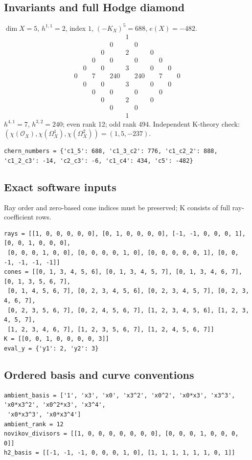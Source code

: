 \documentclass[10pt,a4paper]{article}
\begin{document}
\subsection*{Invariants and full Hodge diamond}
$\dim X=5$, $h^{1,1}=2$, index $1$, $(-K_X)^5=688$, $e(X)=-482$.
\[\begin{array}{ccccccccccc}&&&&&1&&&&&\\&&&&0&&0&&&&\\&&&0&&2&&0&&&\\&&0&&0&&0&&0&&\\&0&&0&&3&&0&&0&\\0&&7&&240&&240&&7&&0\\&0&&0&&3&&0&&0&\\&&0&&0&&0&&0&&\\&&&0&&2&&0&&&\\&&&&0&&0&&&&\\&&&&&1&&&&&\end{array}\]
$h^{4,1}=7$, $h^{3,2}=240$; even rank 12; odd rank 494.
Independent K-theory check: $(\chi(\mathcal O_X),\chi(\Omega_X^1),\chi(\Omega_X^2))=(1, 5, -237)$.
\begin{lstlisting}
chern_numbers = {'c1_5': 688, 'c1_3_c2': 776, 'c1_c2_2': 888, 'c1_2_c3': -14, 'c2_c3': -6, 'c1_c4': 434, 'c5': -482}
\end{lstlisting}
\subsection*{Exact software inputs}
Ray order and zero-based cone indices must be preserved; K consists of full ray-coefficient rows.
\begin{lstlisting}
rays = [[1, 0, 0, 0, 0, 0], [0, 1, 0, 0, 0, 0], [-1, -1, 0, 0, 0, 1], [0, 0, 1, 0, 0, 0],
 [0, 0, 0, 1, 0, 0], [0, 0, 0, 0, 1, 0], [0, 0, 0, 0, 0, 1], [0, 0, -1, -1, -1, -1]]
cones = [[0, 1, 3, 4, 5, 6], [0, 1, 3, 4, 5, 7], [0, 1, 3, 4, 6, 7], [0, 1, 3, 5, 6, 7],
 [0, 1, 4, 5, 6, 7], [0, 2, 3, 4, 5, 6], [0, 2, 3, 4, 5, 7], [0, 2, 3, 4, 6, 7],
 [0, 2, 3, 5, 6, 7], [0, 2, 4, 5, 6, 7], [1, 2, 3, 4, 5, 6], [1, 2, 3, 4, 5, 7],
 [1, 2, 3, 4, 6, 7], [1, 2, 3, 5, 6, 7], [1, 2, 4, 5, 6, 7]]
K = [[0, 0, 1, 0, 0, 0, 0, 3]]
eval_y = {'y1': 2, 'y2': 3}
\end{lstlisting}
\subsection*{Ordered basis and curve conventions}
\begin{lstlisting}
ambient_basis = ['1', 'x3', 'x0', 'x3^2', 'x0^2', 'x0*x3', 'x3^3', 'x0*x3^2', 'x0^2*x3', 'x3^4',
 'x0*x3^3', 'x0*x3^4']
ambient_rank = 12
novikov_divisors = [[1, 0, 0, 0, 0, 0, 0, 0], [0, 0, 0, 1, 0, 0, 0, 0]]
h2_basis = [[-1, -1, -1, 0, 0, 0, 1, 0], [1, 1, 1, 1, 1, 1, 0, 1]]
\end{lstlisting}
\end{document}
